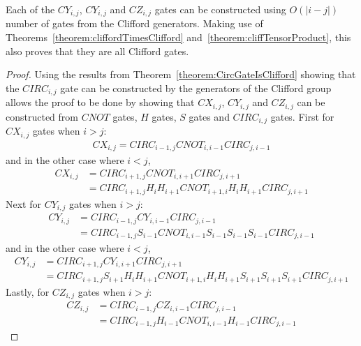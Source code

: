 \begin{theorem}
\label{theorem:CUconstructionAndNumberOfGates}
Each of the $\mathit{CY}_{i,j}$, $\mathit{CY}_{i,j}$ and $\mathit{CZ}_{i,j}$ gates can be constructed using $O\left(\lvert i - j \rvert \right)$ number of gates from the Clifford generators. Making use of Theorems~\ref{theorem:cliffordTimesClifford} and~\ref{theorem:cliffTensorProduct}, this also proves that they are all Clifford gates.
\end{theorem}
\begin{proof}
Using the results from Theorem~\ref{theorem:CircGateIsClifford} showing that the $\mathit{CIRC}_{i,j}$ gate can be constructed by the generators of the Clifford group allows the proof to be done by showing that $\mathit{CX}_{i,j}$, $\mathit{CY}_{i,j}$ and $\mathit{CZ}_{i,j}$ can be constructed from $\mathit{CNOT}$ gates, $H$ gates, $S$ gates and $\mathit{CIRC}_{i,j}$ gates. First for $\mathit{CX}_{i,j}$ gates when $i > j$:
\begin{align}
\mathit{CX}_{i,j} = \mathit{CIRC}_{i-1,j}\mathit{CNOT}_{i,i-1}\mathit{CIRC}_{j,i-1}
\end{align}
and in the other case where $i < j$,
\begin{align}
\mathit{CX}_{i,j} &= \mathit{CIRC}_{i+1,j}\mathit{CNOT}_{i,i+1}\mathit{CIRC}_{j,i+1} \\
&= \mathit{CIRC}_{i+1,j}H_{i}H_{i+1}\mathit{CNOT}_{i+1,i}H_{i}H_{i+1}\mathit{CIRC}_{j,i+1}
\end{align}
Next for $\mathit{CY}_{i,j}$ gates when $i > j$:
\begin{align}
\mathit{CY}_{i,j} &= \mathit{CIRC}_{i-1,j}\mathit{CY}_{i,i-1}\mathit{CIRC}_{j,i-1}\\
&= \mathit{CIRC}_{i-1,j}S_{i-1}\mathit{CNOT}_{i,i-1}S_{i-1}S_{i-1}S_{i-1}\mathit{CIRC}_{j,i-1}
\end{align}
and in the other case where $i < j$,
\begin{align}
\mathit{CY}_{i,j} &= \mathit{CIRC}_{i+1,j}\mathit{CY}_{i,i+1}\mathit{CIRC}_{j,i+1}\\
&= \mathit{CIRC}_{i+1,j}S_{i+1}H_{i}H_{i+1}\mathit{CNOT}_{i+1,i}H_{i}H_{i+1}S_{i+1}S_{i+1}S_{i+1}\mathit{CIRC}_{j,i+1}
\end{align}
Lastly, for $\mathit{CZ}_{i,j}$ gates when $i > j$:
\begin{align}
\mathit{CZ}_{i,j} &= \mathit{CIRC}_{i-1,j}\mathit{CZ}_{i,i-1}\mathit{CIRC}_{j,i-1}\\
&= \mathit{CIRC}_{i-1,j}H_{i-1}\mathit{CNOT}_{i,i-1}H_{i-1}\mathit{CIRC}_{j,i-1}

\end{align}
\end{proof}
